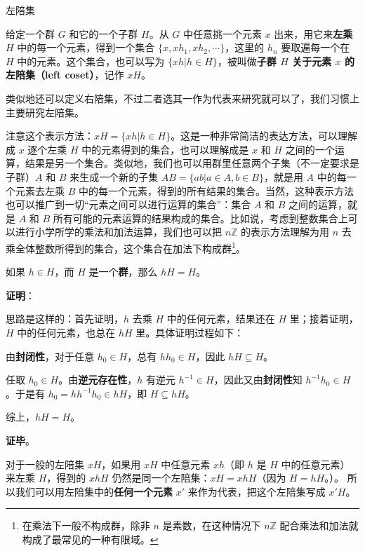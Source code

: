 

\begin{definition}{左陪集}

给定一个群 $G$ 和它的一个子群 $H$。从 $G$ 中任意挑一个元素 $x$ 出来，用它来\textbf{左乘} $H$ 中的每一个元素，得到一个集合 $\{x, xh_1, xh_2, \cdots\}$，这里的 $h_n$ 要取遍每一个在 $H$ 中的元素。这个集合，也可以写为 $\{xh|h\in H\}$，被叫做\textbf{子群 $H$ 关于元素 $x$ 的左陪集（left coset）}，记作 $xH$。 

\end{definition}

类似地还可以定义右陪集，不过二者选其一作为代表来研究就可以了，我们习惯上主要研究左陪集。

注意这个表示方法：$xH=\{xh|h\in H\}$。这是一种非常简洁的表达方法，可以理解成 $x$ 逐个左乘 $H$ 中的元素得到的集合，也可以理解成是 $x$ 和 $H$ 之间的一个运算，结果是另一个集合。类似地，我们也可以用群里任意两个子集（不一定要求是子群）$A$ 和 $B$ 来生成一个新的子集 $AB=\{ab|a\in A, b\in B\}$，就是用 $A$ 中的每一个元素去左乘 $B$ 中的每一个元素，得到的所有结果的集合。当然，这种表示方法也可以推广到一切“元素之间可以进行运算的集合”：集合 $A$ 和 $B$ 之间的运算，就是 $A$ 和 $B$ 所有可能的元素运算的结果构成的集合。比如说，考虑到整数集合上可以进行小学所学的乘法和加法运算，我们也可以把 $n\mathbb{Z}$ 的表示方法理解为用 $n$ 去乘全体整数所得到的集合，这个集合在加法下构成群\footnote{在乘法下一般不构成群，除非 $n$ 是素数，在这种情况下 $n\mathbb{Z}$ 配合乘法和加法就构成了最常见的一种有限域。}。

\begin{theorem}{}
如果 $h\in H$，而 $H$ 是一个\textbf{群}，那么 $hH=H$。
\end{theorem}

\textbf{证明}：

思路是这样的：首先证明，$h$ 去乘 $H$ 中的任何元素，结果还在 $H$ 里；接着证明，$H$ 中的任何元素，也总在 $hH$ 里。具体证明过程如下：

由\textbf{封闭性}，对于任意 $h_0\in H$，总有 $hh_0\in H$，因此 $hH\subseteq H$。

任取 $h_0\in H$。由\textbf{逆元存在性}，$h$ 有逆元 $h^{-1}\in H$，因此又由\textbf{封闭性}知 $h^{-1}h_0\in H$。于是有 $h_0=hh^{-1}h_0\in hH$，即 $H\subseteq hH$。

综上，$hH=H$。

\textbf{证毕}。

对于一般的左陪集 $xH$，如果用 $xH$ 中任意元素 $xh$（即 $h$ 是 $H$ 中的任意元素） 来左乘 $H$，得到的 $xhH$ 仍然是同一个左陪集：$xH=xhH$（因为 $H=hH$。）。 所以我们可以用左陪集中的\textbf{任何一个元素} $x'$ 来作为代表，把这个左陪集写成 $x'H$。

